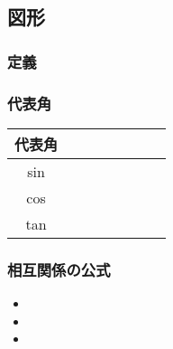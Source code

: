 \documentclass[10pt,dvipdfmx]{jsarticle}
\begin{document}
\newpage
\subsection*{図形}
\begin{table}[h]
  \begin{minipage}[h]{0.3\textwidth}
    \subsubsection*{定義}
  \end{minipage}
  \begin{minipage}[h]{0.7\textwidth}
    \subsubsection*{代表角}
    {\renewcommand\arraystretch{2}
      \begin{table}[H]
        \begin{tabular}{|c||p{1cm}|p{1cm}|p{1cm}|p{1cm}|p{1cm}|p{1cm}|p{1cm}|}
          \hline
          代表角 &  &  &  &  &  &  & \\
          \hline
          sin    &  &  &  &  &  &  & \\
          \hline
          cos    &  &  &  &  &  &  & \\
          \hline
          tan    &  &  &  &  &  &  & \\
          \hline
        \end{tabular}
      \end{table}
    }
  \end{minipage}

\end{table}




\subsubsection*{相互関係の公式}
\begin{multicols}{3}
  \begin{Large}
    \begin{itemize}
      \item
      \item
      \item
    \end{itemize}
  \end{Large}
\end{multicols}
\end{document}
